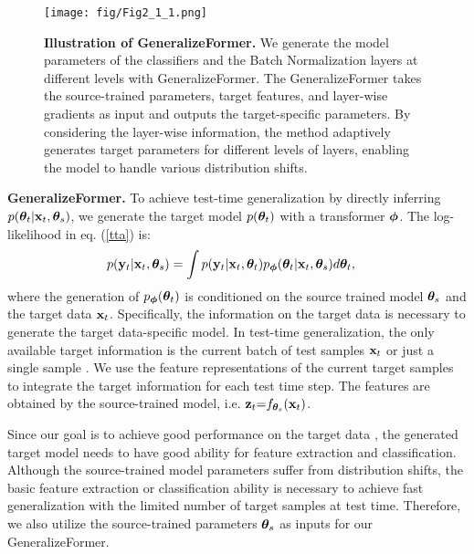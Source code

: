 \begin{figure*}[t]
\centering
\vspace{-2mm}
\texttt{[image: fig/Fig2\_1\_1.png]}
\vspace{-2mm}
\caption{\textbf{Illustration of GeneralizeFormer.} 
We generate the model parameters of the classifiers and the Batch Normalization layers at different levels with GeneralizeFormer. 
The GeneralizeFormer takes the source-trained parameters, target features, and layer-wise gradients as input and outputs the target-specific parameters.
By considering the layer-wise information, the method adaptively generates target parameters for different levels of layers, enabling the model to handle various distribution shifts.}

\label{fig:generalformer}
\vspace{-4mm}
\end{figure*}

\noindent
\textbf{GeneralizeFormer.}
To achieve test-time generalization by directly inferring $p(\boldsymbol{\theta}_{t}|\mathbf{x}_t, \boldsymbol{\theta}_{s})$, we generate the target model $p(\boldsymbol{\theta}_t)$ with a transformer $\boldsymbol{\phi}$.
The log-likelihood in eq. (\ref{tta}) is:
\begin{equation}
\label{tta_gf} %
\begin{aligned}
    p(\y_t|\x_t, \btheta_{s}) & = \int p(\y_t|\x_t, \btheta_{t}) p_{\bphi}(\btheta_{t}|\x_t, \btheta_{s}) d \btheta_{t},
\end{aligned}
\end{equation}
where the generation of $p_{\boldsymbol{\phi}}(\boldsymbol{\theta}_t)$ is conditioned on the source trained model $\boldsymbol{\theta}_s$ and the target data $\mathbf{x}_t$.
Specifically, the information on the target data is necessary to generate the target data-specific model. 
In test-time generalization, the only available target information is the current batch of test samples $\mathbf{x}_t$ or just a single sample \cite{xiao2022learning}. We use the feature representations of the current target samples to integrate the target information for each test time step. The features are obtained by the source-trained model, i.e. $\mathbf{z}_t {=} f_{\boldsymbol{\theta}_s}(\mathbf{x}_t)$. 

Since our goal is to achieve good performance on the target data , the generated target model needs to have good ability for feature extraction and classification.
Although the source-trained model parameters suffer from distribution shifts, the basic feature extraction or classification ability is necessary to achieve fast generalization with the limited number of target samples at test time. Therefore, we also utilize the source-trained parameters $\boldsymbol{\theta}_s$ as inputs for our GeneralizeFormer.

